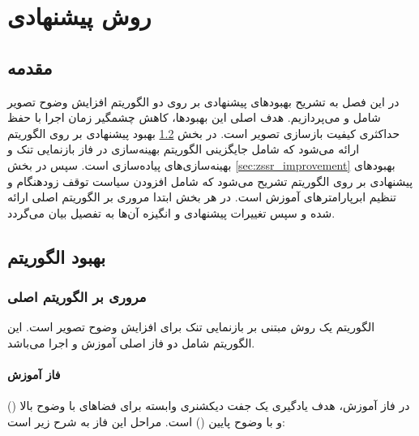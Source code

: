 \chapter{روش پیشنهادی}
\label{chp:proposed_method}
\section{مقدمه}
در این فصل به تشریح بهبودهای پیشنهادی بر روی دو الگوریتم افزایش وضوح تصویر شامل  و  می‌پردازیم. هدف اصلی این بهبودها، کاهش چشمگیر زمان اجرا با حفظ حداکثری کیفیت بازسازی تصویر است. در بخش \ref{sec:scsr_improvement} بهبود پیشنهادی بر روی الگوریتم  ارائه می‌شود که شامل جایگزینی الگوریتم بهینه‌سازی در فاز بازنمایی تنک و بهینه‌سازی‌های پیاده‌سازی است. سپس در بخش \ref{sec:zssr_improvement} بهبودهای پیشنهادی بر روی الگوریتم  تشریح می‌شود که شامل افزودن سیاست توقف زودهنگام و تنظیم ابرپارامترهای آموزش است. در هر بخش ابتدا مروری بر الگوریتم اصلی ارائه شده و سپس تغییرات پیشنهادی و انگیزه آن‌ها به تفصیل بیان می‌گردد.

\section{بهبود الگوریتم }
\label{sec:scsr_improvement}

\subsection{مروری بر الگوریتم اصلی }
الگوریتم  یک روش مبتنی بر بازنمایی تنک برای افزایش وضوح تصویر است. این الگوریتم شامل دو فاز اصلی آموزش و اجرا می‌باشد.

\subsubsection{فاز آموزش}
در فاز آموزش، هدف یادگیری یک جفت دیکشنری وابسته برای فضاهای با وضوح بالا () و با وضوح پایین () است. مراحل این فاز به شرح زیر است:

